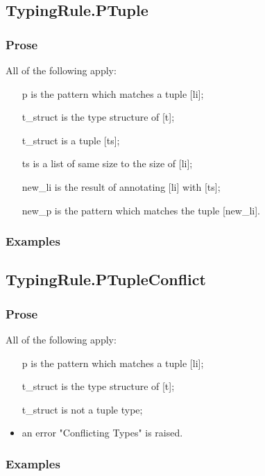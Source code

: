 \documentclass{book}
\begin{document}
\subsection{TypingRule.PTuple}

    \subsubsection{Prose}
    All of the following apply:
   \begin{itemize}
   \item [p] is the pattern which matches a tuple [li];
   \item [t\_struct] is the type structure of [t];
   \item [t\_struct] is a tuple [ts];
   \item [ts] is a list of same size to the size of [li];  
   \item [new\_li] is the result of annotating [li] with [ts];
   \item [new\_p] is the pattern which matches the tuple [new\_li].
   \end{itemize}

    \subsubsection{Examples}

\subsection{TypingRule.PTupleConflict}

    \subsubsection{Prose}
    All of the following apply:
   \begin{itemize}
   \item [p] is the pattern which matches a tuple [li];
   \item [t\_struct] is the type structure of [t];
   \item [t\_struct] is not a tuple type;
   \item an error "Conflicting Types" is raised. 
   \end{itemize}

    \subsubsection{Examples}
\end{document}
